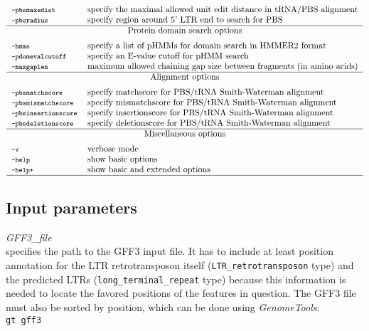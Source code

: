 \documentclass[12pt,titlepage]{article}
\newcommand{\GenomeTools}{\textit{GenomeTools}\xspace}
\begin{document}
\begin{table}[htbp]
\begin{footnotesize}
\[\begin{tabular}{ll}
\\
\Showoption{pbsmaxedist}& specify the maximal allowed unit edit distance in tRNA/PBS alignment
\\
\Showoption{pbsradius}& specify region around 5' LTR end to search for PBS
\\
\Showoptiongroup{Protein domain search options}
\Showoption{hmms}& specify a list of pHMMs for domain search in HMMER2 format
\\
\Showoption{pdomevalcutoff}& specify an E-value cutoff for pHMM search
\\
\Showoption{maxgaplen}& maximum allowed chaining gap size between fragments (in amino acids)

\\
\Showoptiongroup{Alignment options}
\Showoption{pbsmatchscore}& specify matchscore for PBS/tRNA Smith-Waterman alignment
\\
\Showoption{pbsmismatchscore}& specify mismatchscore for PBS/tRNA Smith-Waterman alignment
\\
\Showoption{pbsinsertionscore}& specify insertionscore for PBS/tRNA Smith-Waterman alignment
\\
\Showoption{pbsdeletionscore}& specify deletionscore for PBS/tRNA Smith-Waterman alignment
\\
\Showoptiongroup{Miscellaneous options}
\Showoption{v}& verbose mode
\\
\Showoption{help}& show basic options
\\
\Showoption{help+}& show basic and extended options
\\
\hline
\end{tabular}
\]
\end{footnotesize}
\label{overviewOpt}
\end{table}

\newpage
\subsection{Input parameters}

\emph{GFF3\_file}\\ specifies the path to the GFF3 input file. It has to include at least position annotation for the LTR retrotransposon itself (\texttt{LTR\_retrotransposon} type) and the predicted LTRs (\texttt{long\_terminal\_repeat} type) because this information is needed to locate the favored positions of the features in question. The GFF3 file must also be sorted by position, which can be done using \GenomeTools :\\
\texttt{gt gff3}   \texttt{} \\
\end{document}
